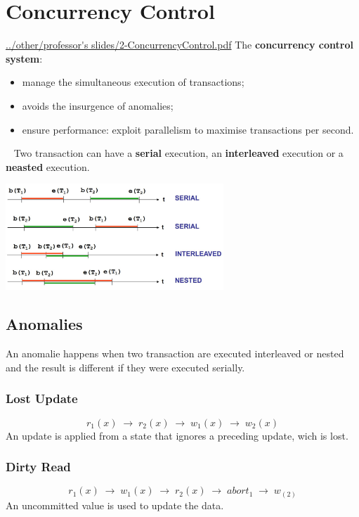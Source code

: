 \section{Concurrency Control}
\url{../other/professor's slides/2-ConcurrencyControl.pdf}\newline
\newline
The \textbf{concurrency control system}:
\begin{itemize}
    \item manage the simultaneous execution of transactions;
    \item avoids the insurgence of anomalies;
    \item ensure performance: exploit parallelism to maximise transactions per
    second.
\end{itemize}
\ \newline
Two transaction can have a \textbf{serial} execution, an \textbf{interleaved} execution or a \textbf{neasted} execution.
\begin{center}
    \includegraphics[height=4cm]{../arguments/serial-interleaved-nested.JPG}
\end{center}
\subsection{Anomalies}
An anomalie happens when two transaction are executed interleaved or nested and the result is different if they were executed serially.
\subsubsection{Lost Update}
\[
    r_1(x) \; \rightarrow \; r_2(x) \; \rightarrow \; w_1(x) \; \rightarrow \; w_2(x)
\]
An update is applied from a state that ignores a preceding update, wich is lost.
\subsubsection{Dirty Read}
\[
    r_1(x) \; \rightarrow \; w_1(x) \; \rightarrow \; r_2(x) \; \rightarrow \; abort_1 \; \rightarrow \; w_(2)
\]
An uncommitted value is used to update the data.
